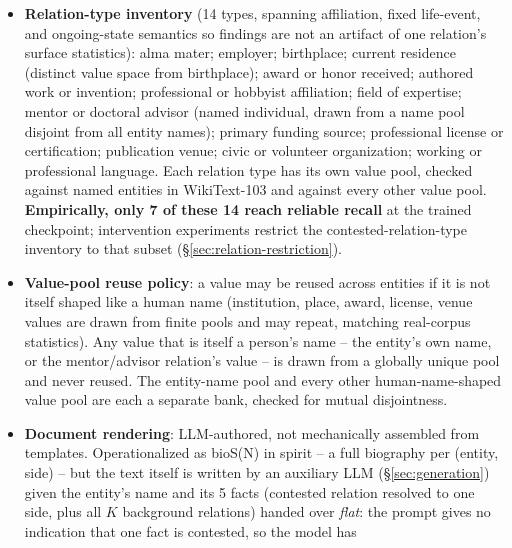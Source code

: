 \documentclass[11pt]{article}
\begin{document}
\begin{itemize}
    count, every other attribute in that instance is restated too. Allowing
    multiple simultaneously-contested relations per entity would couple
    their exposure patterns through shared document instances, correlating
    which side wins across relations by construction. A single contested
    relation per entity keeps each conflict pair's exposure pattern clean.
  \item \textbf{Relation-type inventory} (14 types, spanning affiliation,
    fixed life-event, and ongoing-state semantics so findings are not an
    artifact of one relation's surface statistics): alma mater; employer;
    birthplace; current residence (distinct value space from birthplace);
    award or honor received; authored work or invention; professional or
    hobbyist affiliation; field of expertise; mentor or doctoral advisor
    (named individual, drawn from a name pool disjoint from all entity
    names); primary funding source; professional license or certification;
    publication venue; civic or volunteer organization; working or
    professional language. Each relation type has its own value pool,
    checked against named entities in WikiText-103 and against every other
    value pool. \textbf{Empirically, only 7 of these 14 reach reliable
    recall} at the trained checkpoint; intervention experiments restrict the
    contested-relation-type inventory to that subset
    (\S\ref{sec:relation-restriction}).
  \item \textbf{Value-pool reuse policy}: a value may be reused across
    entities if it is not itself shaped like a human name (institution,
    place, award, license, venue values are drawn from finite pools and may
    repeat, matching real-corpus statistics). Any value that is itself a
    person's name -- the entity's own name, or the mentor/advisor relation's
    value -- is drawn from a globally unique pool and never reused. The
    entity-name pool and every other human-name-shaped value pool are each a
    separate bank, checked for mutual disjointness.
  \item \textbf{Document rendering}: LLM-authored, not mechanically assembled
    from templates. Operationalized as bioS(N) in spirit
    \citep{allenzhu2023physics} -- a full biography per (entity, side) -- but
    the text itself is written by an auxiliary LLM (\S\ref{sec:generation})
    given the entity's name and its 5 facts (contested relation resolved to
    one side, plus all $K$ background relations) handed over \emph{flat}: the
    prompt gives no indication that one fact is contested, so the model has

\end{itemize}
\end{document}
